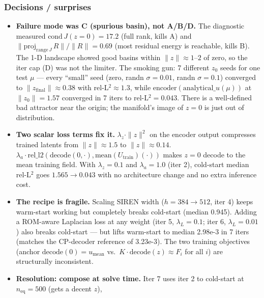 \subsubsection*{Decisions / surprises}
\begin{itemize}
  \item \textbf{Failure mode was C (spurious basin), not A/B/D.} The
        diagnostic measured $\text{cond}\,J(z{=}0) = 17.2$ (full rank,
        kills A) and $\|\text{proj}_{\text{range}\,J}\,R\| / \|R\| = 0.69$
        (most residual energy is reachable, kills B). The 1-D landscape
        showed good basins within $\|z\| \approx 1$--$2$ of zero, so the
        iter cap (D) was not the limiter. The smoking gun: 7 different
        $z_0$ seeds for one test $\mu$ --- every ``small'' seed (zero,
        randn $\sigma{=}0.01$, randn $\sigma{=}0.1$) converged to
        $\|z_{\text{final}}\| \approx 0.38$ with rel-L$^2 \approx 1.3$,
        while $\text{encoder}(\text{analytical}\_u(\mu))$ at
        $\|z_0\|{=}1.57$ converged in 7 iters to rel-L$^2 = 0.043$. There
        is a well-defined bad attractor near the origin; the manifold's
        image of $z{=}0$ is just out of distribution.
  \item \textbf{Two scalar loss terms fix it.} $\lambda_z \cdot \|z\|^2$
        on the encoder output compresses trained latents from
        $\|z\| \approx 1.5$ to $\|z\| \approx 0.14$.
        $\lambda_a \cdot \text{rel\_l2}(\text{decode}(0,\cdot),
        \text{mean}(U_{\text{train}})(\cdot))$ makes $z{=}0$ decode to
        the mean training field. With $\lambda_z{=}0.1$ and
        $\lambda_a{=}1.0$ (iter 2), cold-start median rel-L$^2$ goes
        $1.565 \rightarrow 0.043$ with no architecture change and no
        extra inference cost.
  \item \textbf{The recipe is fragile.} Scaling SIREN width
        ($h{=}384 \rightarrow 512$, iter 4) keeps warm-start working but
        completely breaks cold-start (median 0.945). Adding a ROM-aware
        Laplacian loss at any weight (iter 5, $\lambda_L{=}0.1$; iter 6,
        $\lambda_L{=}0.01$) also breaks cold-start --- but lifts
        warm-start to median 2.98e-3 in 7 iters (matches the CP-decoder
        reference of 3.23e-3). The two training objectives (anchor
        $\text{decode}(0) = u_{\text{mean}}$ vs.\ $K \cdot
        \text{decode}(z) \approx F_i$ for all $i$) are structurally
        inconsistent.
  \item \textbf{Resolution: compose at solve time.} Iter 7 uses iter 2
        to cold-start at $n_{\text{eq}}{=}500$ (gets a decent $z$),

\end{itemize}
